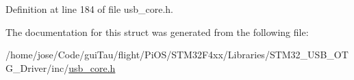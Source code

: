 Definition at line 184 of file usb\-\_\-core.\-h.



The documentation for this struct was generated from the following file\-:\begin{DoxyCompactItemize}
\item 
/home/jose/\-Code/gui\-Tau/flight/\-Pi\-O\-S/\-S\-T\-M32\-F4xx/\-Libraries/\-S\-T\-M32\-\_\-\-U\-S\-B\-\_\-\-O\-T\-G\-\_\-\-Driver/inc/\hyperlink{_s_t_m32_f4xx_2_libraries_2_s_t_m32___u_s_b___o_t_g___driver_2inc_2usb__core_8h}{usb\-\_\-core.\-h}\end{DoxyCompactItemize}
